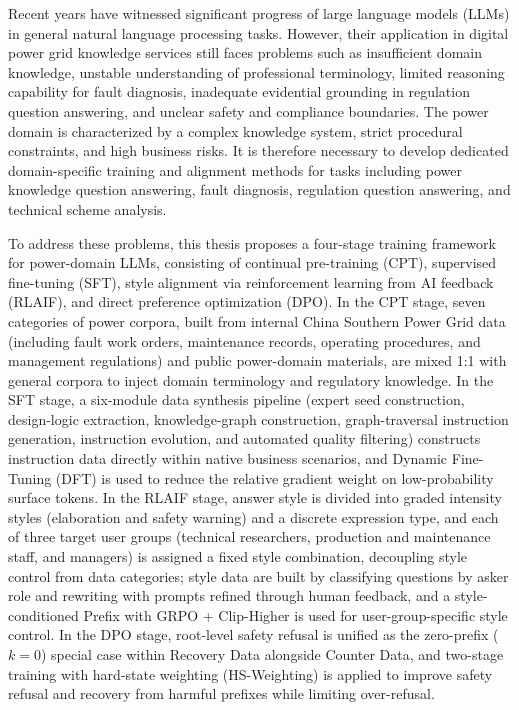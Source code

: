 \documentclass[fontset=fandol,type=master,campus=shenzhen,etitleauto=true]{hithesisbook}
\begin{document}
\begin{eabstract}
Recent years have witnessed significant progress of large language models (LLMs) in general natural language processing tasks. However, their application in digital power grid knowledge services still faces problems such as insufficient domain knowledge, unstable understanding of professional terminology, limited reasoning capability for fault diagnosis, inadequate evidential grounding in regulation question answering, and unclear safety and compliance boundaries. The power domain is characterized by a complex knowledge system, strict procedural constraints, and high business risks. It is therefore necessary to develop dedicated domain-specific training and alignment methods for tasks including power knowledge question answering, fault diagnosis, regulation question answering, and technical scheme analysis.

To address these problems, this thesis proposes a four-stage training framework for power-domain LLMs, consisting of continual pre-training (CPT), supervised fine-tuning (SFT), style alignment via reinforcement learning from AI feedback (RLAIF), and direct preference optimization (DPO). In the CPT stage, seven categories of power corpora, built from internal China Southern Power Grid data (including fault work orders, maintenance records, operating procedures, and management regulations) and public power-domain materials, are mixed 1:1 with general corpora to inject domain terminology and regulatory knowledge. In the SFT stage, a six-module data synthesis pipeline (expert seed construction, design-logic extraction, knowledge-graph construction, graph-traversal instruction generation, instruction evolution, and automated quality filtering) constructs instruction data directly within native business scenarios, and Dynamic Fine-Tuning (DFT) is used to reduce the relative gradient weight on low-probability surface tokens. In the RLAIF stage, answer style is divided into graded intensity styles (elaboration and safety warning) and a discrete expression type, and each of three target user groups (technical researchers, production and maintenance staff, and managers) is assigned a fixed style combination, decoupling style control from data categories; style data are built by classifying questions by asker role and rewriting with prompts refined through human feedback, and a style-conditioned Prefix with GRPO + Clip-Higher is used for user-group-specific style control. In the DPO stage, root-level safety refusal is unified as the zero-prefix ($k=0$) special case within Recovery Data alongside Counter Data, and two-stage training with hard-state weighting (HS-Weighting) is applied to improve safety refusal and recovery from harmful prefixes while limiting over-refusal.


\end{eabstract}
\end{document}
